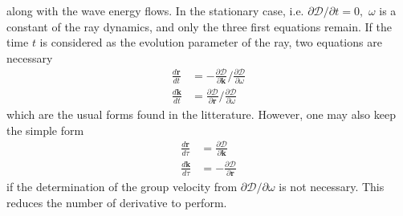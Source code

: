 \documentclass[a4paper,12pt]{article}%
\begin{document}
along with the wave energy flows. In the stationary case, i.e. $\partial
\mathcal{D}/\partial t=0,$ $\omega$ is a constant of the ray dynamics, and
only the three first equations remain. If the time $t$ is considered as the
evolution parameter of the ray, two equations are necessary
\begin{align}
\frac{d\mathbf{r}}{dt}  &  =-\frac{\partial\mathcal{D}}{\partial\mathbf{k}%
}/\frac{\partial\mathcal{D}}{\partial\omega}\label{rayeq1a}\\
\frac{d\mathbf{k}}{dt}  &  =\frac{\partial\mathcal{D}}{\partial\mathbf{r}%
}/\frac{\partial\mathcal{D}}{\partial\omega} \label{rayeq2a}%
\end{align}
which are the usual forms found in the litterature. However, one may also keep
the simple form%
\begin{align}
\frac{d\mathbf{r}}{d\tau}  &  =\frac{\partial\mathcal{D}}{\partial\mathbf{k}%
}\label{rayeq1b}\\
\frac{d\mathbf{k}}{d\tau}  &  =-\frac{\partial\mathcal{D}}{\partial\mathbf{r}}
\label{rayeq2b}%
\end{align}
if the determination of the group velocity from $\partial\mathcal{D}%
/\partial\omega$ is not necessary. This reduces the number of derivative to perform.
\end{document}

